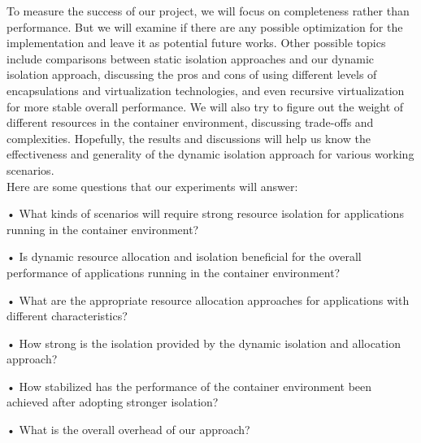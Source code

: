 \documentclass[10pt, conference,compsoc]{IEEEtran}
\begin{document}
To measure the success of our project, we will focus on completeness rather than performance. But we will examine if there are any possible optimization for the implementation and leave it as potential future works. Other possible topics include comparisons between static isolation approaches and our dynamic isolation approach, discussing the pros and cons of using different levels of encapsulations and virtualization technologies, and even recursive virtualization for more stable overall performance. We will also try to figure out the weight of different resources in the container environment, discussing trade-offs and complexities. Hopefully, the results and discussions will help us know the effectiveness and generality of the dynamic isolation approach for various working scenarios.\\

Here are some questions that our experiments will answer:

• What kinds of scenarios will require strong resource isolation for applications running in the container environment?

• Is dynamic resource allocation and isolation beneficial for the overall performance of applications running in the container environment?

• What are the appropriate resource allocation approaches for applications with different characteristics?

• How strong is the isolation provided by the dynamic isolation and allocation approach? 

• How stabilized has the performance of the container environment been achieved after adopting stronger isolation?

• What is the overall overhead of our approach? 









%
%
%






\end{document}
